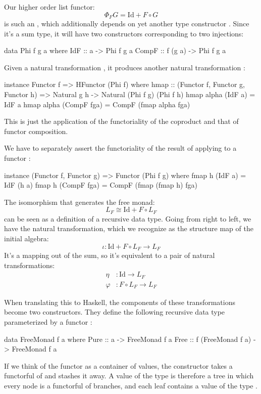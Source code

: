 \documentclass[DaoFP]{subfiles}
\begin{document}
Our higher order list functor:
\[ \Phi_F G = \text{Id} + F \circ G \]
is such an , which additionally depends on yet another type constructor . Since it's a sum type, it will have two constructors corresponding to two injections:
\begin{haskell}
data Phi f g a where
   IdF :: a -> Phi f g a
   CompF :: f (g a) -> Phi f g a
\end{haskell}
Given a natural transformation , it produces another natural transformation :
\begin{haskell}
instance Functor f => HFunctor (Phi f) where
   hmap :: (Functor f, Functor g, Functor h) =>
          Natural g h -> Natural (Phi f g) (Phi f h)
   hmap alpha (IdF a) = IdF a
   hmap alpha (CompF fga) = CompF (fmap alpha fga)
\end{haskell}
This is just the application of the functoriality of the coproduct and that of functor composition.

We have to separately assert the functoriality of the result of applying  to a functor :
\begin{haskell}
instance (Functor f, Functor g) => Functor (Phi f g) where
   fmap h (IdF a) = IdF (h a)
   fmap h (CompF fga) = CompF (fmap (fmap h) fga)
\end{haskell}



The isomorphism that generates the free monad:
\[ L_F \cong \text{Id} + F \circ L_F \]
can be seen as a definition of a recursive data type. Going from right to left, we have the natural transformation, which we recognize as the structure map of the initial algebra:
\[\iota \colon \text{Id} + F \circ L_F \to L_F\]
It's a mapping out of the sum, so it's equivalent to a pair of natural transformations:
\begin{align*}
\eta &\colon \text{Id} \to L_F
\\
\varphi &\colon F \circ L_F \to L_F
\end{align*}

When translating this to Haskell, the components of these transformations become two constructors. They define the following recursive data type parameterized by a functor :
\begin{haskell}
data FreeMonad f a where
   Pure :: a -> FreeMonad f a
   Free :: f (FreeMonad f a) -> FreeMonad f a
\end{haskell}

If we think of the functor  as a container of values, the constructor  takes a functorful of  and stashes it away. A value of the type  is therefore a tree in which every node is a functorful of branches, and each leaf contains a value of the type .
\end{document}
